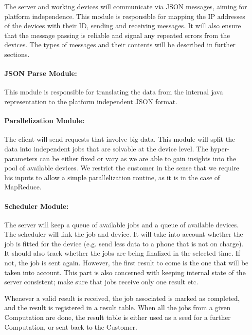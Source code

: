 \documentclass[a4paper,10pt]{article}
\begin{document}
The server and working devices will communicate via JSON messages, aiming for platform independence. This module is responsible for mapping the IP addresses of the devices with their ID, sending and receiving messages. It will also ensure that the message passing is reliable and signal any repeated errors from the devices. The types of messages and their contents will be described in further sections.

\paragraph{JSON Parse Module:}

This module is responsible for translating the data from the internal java representation to the platform independent JSON format. 

\paragraph{Parallelization Module:}

The client will send requests that involve big data. This module will split the data into independent jobs that are solvable at the device level. The hyper-parameters can be either fixed or vary as we are able to gain insights into the pool of available devices. We restrict the customer in the sense that we require his inputs to allow a simple parallelization routine, as it is in the case of MapReduce. 

\paragraph{Scheduler Module:}

The server will keep a queue of available jobs and a queue of available devices. The scheduler will link the job and device. It will take into account whether the job is fitted for the device (e.g. send less data to a phone that is not on charge). It should also track whether the jobs are being finalized in the selected time. If not, the job is sent again. However, the first result to come is the one that will be taken into account. This part is also concerned with keeping internal state of the server consistent; make sure that jobs receive only one result etc.

Whenever a valid result is received, the job associated is marked as completed, and the result is registered in a result table. When all the jobs from a given Computation are done, the result table is either used as a seed for a further Computation, or sent back to the Customer. 
\end{document}
